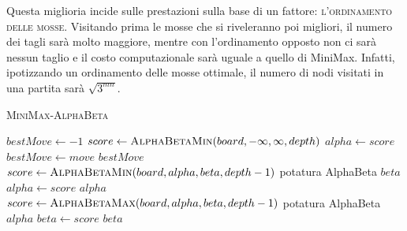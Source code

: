 \documentclass{article}
\begin{document}
Questa miglioria incide sulle prestazioni sulla base di un fattore: \textsc{l'ordinamento delle mosse}.
Visitando prima le mosse che si riveleranno poi migliori, il numero dei tagli sarà molto maggiore,
mentre con l'ordinamento opposto non ci sarà nessun taglio e il costo computazionale sarà uguale a 
quello di MiniMax. Infatti, ipotizzando un ordinamento delle mosse ottimale, il numero di nodi visitati
in una partita sarà $\sqrt{3^{mn}}$.
\pagebreak

\begin{algorithm}[H]
    \caption{\textsc{MiniMax-AlphaBeta}}
    \label{alg:minimax}
    \begin{algorithmic}[H]
        \State $bestMove \gets -1$
            \State $score \gets \Call{AlphaBetaMin}{board,-\infty,\infty,depth}$
              \State $alpha \gets score$
              \State $bestMove \gets move$
            \EndIf
      \EndFor
      \State \Return $bestMove$
      \EndProcedure \\
          \State \Return {}
        \EndIf
            \State $score \gets \Call{AlphaBetaMin}{board,alpha,beta,depth-1}$
            \Comment potatura AlphaBeta
              \State \Return $beta$
            \EndIf
              \State $alpha \gets score$
            \EndIf
      \EndFor
      \State \Return $alpha$
      \EndProcedure \\
          \State \Return {}
        \EndIf
            \State $score \gets \Call{AlphaBetaMax}{board,alpha,beta,depth-1}$
            \Comment potatura AlphaBeta
              \State \Return $alpha$
            \EndIf
              \State $beta \gets score$
            \EndIf
      \EndFor
      \State \Return $beta$
      \EndProcedure
    \end{algorithmic}
  \end{algorithm}

\pagebreak
\end{document}
